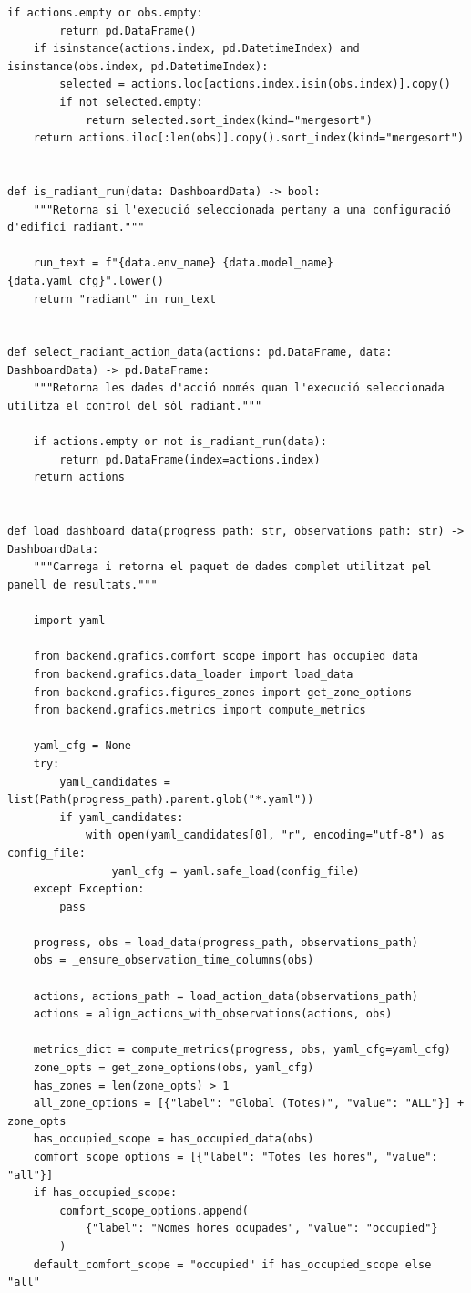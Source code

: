 \documentclass[10pt,a4paper]{article}
\begin{document}
\begin{lstlisting}[style=studioPython,caption={backend/resultats\_backend.py},label={lst:backend-resultats-backend-py}]
    if actions.empty or obs.empty:
        return pd.DataFrame()
    if isinstance(actions.index, pd.DatetimeIndex) and isinstance(obs.index, pd.DatetimeIndex):
        selected = actions.loc[actions.index.isin(obs.index)].copy()
        if not selected.empty:
            return selected.sort_index(kind="mergesort")
    return actions.iloc[:len(obs)].copy().sort_index(kind="mergesort")


def is_radiant_run(data: DashboardData) -> bool:
    """Retorna si l'execució seleccionada pertany a una configuració d'edifici radiant."""

    run_text = f"{data.env_name} {data.model_name} {data.yaml_cfg}".lower()
    return "radiant" in run_text


def select_radiant_action_data(actions: pd.DataFrame, data: DashboardData) -> pd.DataFrame:
    """Retorna les dades d'acció només quan l'execució seleccionada utilitza el control del sòl radiant."""

    if actions.empty or not is_radiant_run(data):
        return pd.DataFrame(index=actions.index)
    return actions


def load_dashboard_data(progress_path: str, observations_path: str) -> DashboardData:
    """Carrega i retorna el paquet de dades complet utilitzat pel panell de resultats."""

    import yaml

    from backend.grafics.comfort_scope import has_occupied_data
    from backend.grafics.data_loader import load_data
    from backend.grafics.figures_zones import get_zone_options
    from backend.grafics.metrics import compute_metrics

    yaml_cfg = None
    try:
        yaml_candidates = list(Path(progress_path).parent.glob("*.yaml"))
        if yaml_candidates:
            with open(yaml_candidates[0], "r", encoding="utf-8") as config_file:
                yaml_cfg = yaml.safe_load(config_file)
    except Exception:
        pass

    progress, obs = load_data(progress_path, observations_path)
    obs = _ensure_observation_time_columns(obs)

    actions, actions_path = load_action_data(observations_path)
    actions = align_actions_with_observations(actions, obs)

    metrics_dict = compute_metrics(progress, obs, yaml_cfg=yaml_cfg)
    zone_opts = get_zone_options(obs, yaml_cfg)
    has_zones = len(zone_opts) > 1
    all_zone_options = [{"label": "Global (Totes)", "value": "ALL"}] + zone_opts
    has_occupied_scope = has_occupied_data(obs)
    comfort_scope_options = [{"label": "Totes les hores", "value": "all"}]
    if has_occupied_scope:
        comfort_scope_options.append(
            {"label": "Nomes hores ocupades", "value": "occupied"}
        )
    default_comfort_scope = "occupied" if has_occupied_scope else "all"


\end{lstlisting}
\end{document}
